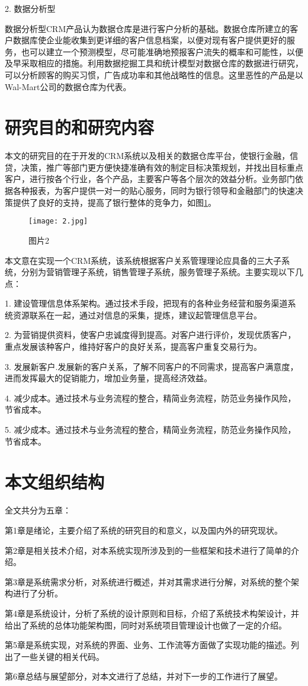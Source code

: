 2.	数据分析型

数据分析型CRM产品认为数据仓库是进行客户分析的基础。数据仓库所建立的客户数据库使企业能收集到更详细的客户信息档案，以便对现有客户提供更好的服务，也可以建立一个预测模型，尽可能准确地预报客户流失的概率和可能性，以便及早采取相应的措施。利用数据挖掘工具和统计模型对数据仓库的数据进行研究，可以分析顾客的购买习惯，广告成功率和其他战略性的信息。这里恶性的产品是以Wal-Mart公司的数据仓库为代表。

\section{研究目的和研究内容}
本文的研究目的在于开发的CRM系统以及相关的数据仓库平台，使银行金融，信贷，决策，推广等部门更方便快捷准确有效的制定目标决策规划，并找出目标重点客户，进行按各个行业，各个产品，主要客户等各个层次的效益分析。业务部门依据各种报表，为客户提供一对一的贴心服务，同时为银行领导和金融部门的快速决策提供了良好的支持，提高了银行整体的竞争力，如图\ref{f2}。
\begin{figure}[htbp]
  \centering
  \texttt{[image: 2.jpg]}\\
  \caption{图片2}\label{f2}
\end{figure}


本文意在实现一个CRM系统，该系统根据客户关系管理理论应具备的三大子系统，分别为营销管理子系统，销售管理子系统，服务管理子系统。主要实现以下几点：

1. 建设管理信息体系架构。通过技术手段，把现有的各种业务经营和服务渠道系统资源联系在一起，通过对信息的采集，提炼，建议起管理信息平台。

2. 为营销提供资料，使客户忠诚度得到提高。对客户进行评价，发现优质客户，重点发展该种客户，维持好客户的良好关系，提高客户重复交易行为。

3. 发展新客户.发展新的客户关系，了解不同客户的不同需求，提高客户满意度，进而发挥最大的促销能力，增加业务量，提高经济效益。

4. 减少成本。通过技术与业务流程的整合，精简业务流程，防范业务操作风险，节省成本。

5. 减少成本。通过技术与业务流程的整合，精简业务流程，防范业务操作风险，节省成本。

\section{本文组织结构}
全文共分为五章：

第1章是绪论，主要介绍了系统的研究目的和意义，以及国内外的研究现状。

第2章是相关技术介绍，对本系统实现所涉及到的一些框架和技术进行了简单的介绍。

第3章是系统需求分析，对系统进行概述，并对其需求进行分解，对系统的整个架构进行了分析。

第4章是系统设计，分析了系统的设计原则和目标，介绍了系统技术构架设计，并给出了系统的总体功能架构图，同时对系统项目管理设计也做了一定的介绍。

第5章是系统实现，对系统的界面、业务、工作流等方面做了实现功能的描述。列出了一些关键的相关代码。

第6章总结与展望部分，对本文进行了总结，并对下一步的工作进行了展望。





